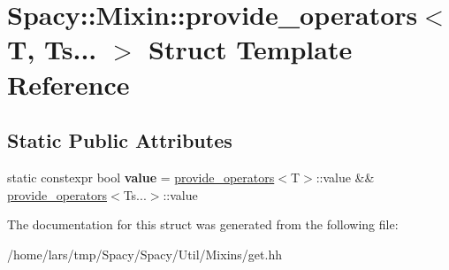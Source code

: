 \hypertarget{structSpacy_1_1Mixin_1_1provide__operators_3_01T_00_01Ts_8_8_8_01_4}{}\section{Spacy\+:\+:Mixin\+:\+:provide\+\_\+operators$<$ T, Ts... $>$ Struct Template Reference}
\label{structSpacy_1_1Mixin_1_1provide__operators_3_01T_00_01Ts_8_8_8_01_4}
\subsection*{Static Public Attributes}
\begin{DoxyCompactItemize}
\item 
static constexpr bool {\bfseries value} = \hyperlink{structSpacy_1_1Mixin_1_1provide__operators}{provide\+\_\+operators}$<$T$>$\+::value \&\& \hyperlink{structSpacy_1_1Mixin_1_1provide__operators}{provide\+\_\+operators}$<$Ts...$>$\+::value\hypertarget{structSpacy_1_1Mixin_1_1provide__operators_3_01T_00_01Ts_8_8_8_01_4_a9a88d8b7418fe5e0c633c4116493ce4b}{}\label{structSpacy_1_1Mixin_1_1provide__operators_3_01T_00_01Ts_8_8_8_01_4_a9a88d8b7418fe5e0c633c4116493ce4b}

\end{DoxyCompactItemize}


The documentation for this struct was generated from the following file\+:\begin{DoxyCompactItemize}
\item 
/home/lars/tmp/\+Spacy/\+Spacy/\+Util/\+Mixins/get.\+hh\end{DoxyCompactItemize}
